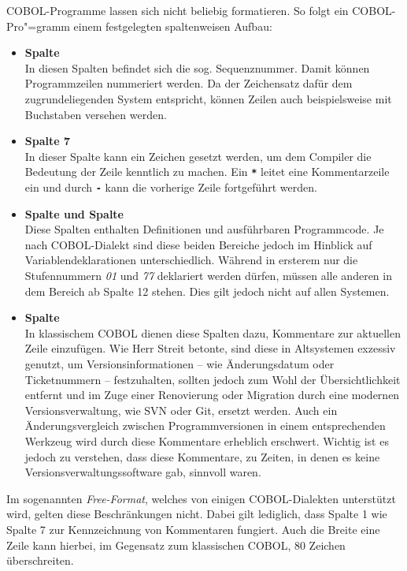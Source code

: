 COBOL-Programme lassen sich nicht beliebig formatieren. So folgt ein COBOL-Pro"=gramm einem festgelegten spaltenweisen Aufbau:
\begin{itemize}
    \item \textbf{Spalte }\\
    In diesen Spalten befindet sich die sog. Sequenznummer. Damit können Programmzeilen nummeriert werden. Da der Zeichensatz dafür dem zugrundeliegenden System entspricht, können Zeilen auch beispielsweise mit Buchstaben versehen werden.
    \item \textbf{Spalte 7}\\
    In dieser Spalte kann ein Zeichen gesetzt werden, um dem Compiler die Bedeutung der Zeile kenntlich zu machen. Ein {\tt\textbf{*}} leitet \zB eine Kommentarzeile ein und durch {\tt\textbf{-}} kann die vorherige Zeile fortgeführt werden.
    \item \textbf{Spalte  und Spalte }\\
    Diese Spalten enthalten Definitionen und ausführbaren Programmcode. Je nach COBOL-Dialekt sind diese beiden Bereiche jedoch im Hinblick auf Variablendeklarationen unterschiedlich. Während in ersterem nur die Stufennummern \textit{01} und \textit{77} deklariert werden dürfen, müssen alle anderen in dem Bereich ab Spalte 12 stehen. Dies gilt jedoch nicht auf allen Systemen.
    \item \textbf{Spalte }\\
    In klassischem COBOL dienen diese Spalten dazu, Kommentare zur aktuellen Zeile einzufügen. Wie Herr Streit betonte, sind diese in Altsystemen exzessiv genutzt, um Versionsinformationen -- wie Änderungsdatum oder Ticketnummern -- festzuhalten, sollten jedoch zum Wohl der Übersichtlichkeit entfernt und im Zuge einer Renovierung oder Migration durch eine modernen Versionsverwaltung, wie \zB SVN oder Git, ersetzt werden. Auch ein Änderungsvergleich zwischen Programmversionen in einem entsprechenden Werkzeug wird durch diese Kommentare erheblich erschwert. Wichtig ist es jedoch zu verstehen, dass diese Kommentare, zu Zeiten, in denen es keine Versionsverwaltungssoftware gab, sinnvoll waren.
\end{itemize}

Im sogenannten \textit{Free-Format}, welches von einigen COBOL-Dialekten unterstützt wird, gelten diese Beschränkungen nicht. Dabei gilt lediglich, dass Spalte 1 wie Spalte 7 zur Kennzeichnung von Kommentaren fungiert. Auch die Breite eine Zeile kann hierbei, im Gegensatz zum klassischen COBOL, 80 Zeichen überschreiten. 